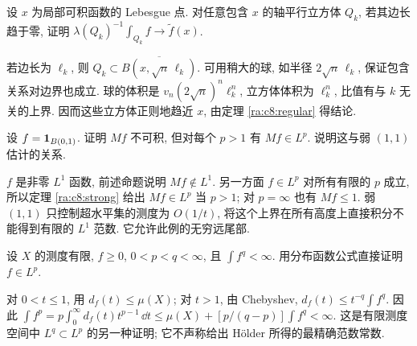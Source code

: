 \begin{exercise}
设 $x$ 为局部可积函数的 Lebesgue 点. 对任意包含 $x$ 的轴平行立方体 $Q_k$, 若其边长趋于零, 证明 $\lambda(Q_k)^{-1}\int_{Q_k}f\to\widetilde f(x)$.
\end{exercise}
\begin{solution}
若边长为 $\ell_k$, 则 $Q_k\subset\overline{B(x,\sqrt n\,\ell_k)}$. 可用稍大的球, 如半径 $2\sqrt n\,\ell_k$, 保证包含关系对边界也成立. 球的体积是 $v_n(2\sqrt n)^n\ell_k^n$, 立方体体积为 $\ell_k^n$, 比值有与 $k$ 无关的上界. 因而这些立方体正则地趋近 $x$, 由定理 \ref{ra:c8:regular} 得结论.
\end{solution}

\begin{exercise}
设 $f=\mathbf 1_{B(0,1)}$. 证明 $Mf$ 不可积, 但对每个 $p>1$ 有 $Mf\in L^p$. 说明这与弱 $(1,1)$ 估计的关系.
\end{exercise}
\begin{solution}
$f$ 是非零 $L^1$ 函数, 前述命题说明 $Mf\notin L^1$. 另一方面 $f\in L^p$ 对所有有限的 $p$ 成立, 所以定理 \ref{ra:c8:strong} 给出 $Mf\in L^p$ 当 $p>1$; 对 $p=\infty$ 也有 $Mf\le1$. 弱 $(1,1)$ 只控制超水平集的测度为 $O(1/t)$, 将这个上界在所有高度上直接积分不能得到有限的 $L^1$ 范数. 它允许此例的无穷远尾部.
\end{solution}

\begin{exercise}
设 $X$ 的测度有限, $f\ge0$, $0<p<q<\infty$, 且 $\int f^q<\infty$. 用分布函数公式直接证明 $f\in L^p$.
\end{exercise}
\begin{solution}
对 $0<t\le1$, 用 $d_f(t)\le\mu(X)$; 对 $t>1$, 由 Chebyshev, $d_f(t)\le t^{-q}\int f^q$. 因此
$\int f^p=p\int_0^\infty d_f(t)t^{p-1}\,\dd t
\le\mu(X)+[p/(q-p)]\int f^q<\infty$.
这是有限测度空间中 $L^q\subset L^p$ 的另一种证明; 它不声称给出 Hölder 所得的最精确范数常数.
\end{solution}

